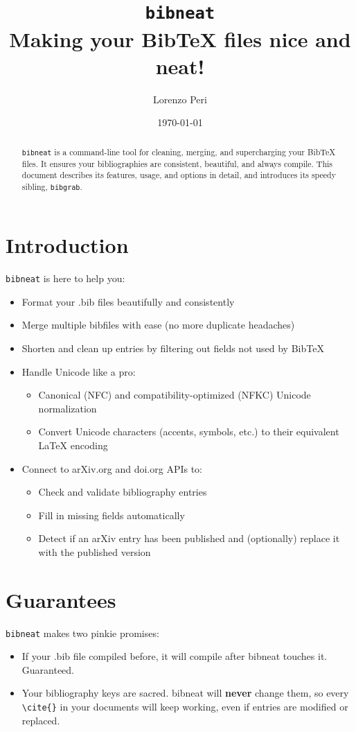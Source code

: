 \documentclass[11pt]{article}
\title{\texttt{bibneat} \\ \large Making your BibTeX files nice and neat!}
\author{Lorenzo Peri}
\date{\today}
\begin{document}
\maketitle

\begin{abstract}
\texttt{bibneat} is a command-line tool for cleaning, merging, and supercharging your BibTeX files. It ensures your bibliographies are consistent, beautiful, and always compile. This document describes its features, usage, and options in detail, and introduces its speedy sibling, \texttt{bibgrab}.
\end{abstract}

\section{Introduction}
\texttt{bibneat} is here to help you:
\begin{itemize}
    \item Format your .bib files beautifully and consistently
    \item Merge multiple bibfiles with ease (no more duplicate headaches)
    \item Shorten and clean up entries by filtering out fields not used by BibTeX
    \item Handle Unicode like a pro:
    \begin{itemize}
        \item Canonical (NFC) and compatibility-optimized (NFKC) Unicode normalization
        \item Convert Unicode characters (accents, symbols, etc.) to their equivalent LaTeX encoding
    \end{itemize}
    \item Connect to arXiv.org and doi.org APIs to:
    \begin{itemize}
        \item Check and validate bibliography entries
        \item Fill in missing fields automatically
        \item Detect if an arXiv entry has been published and (optionally) replace it with the published version
    \end{itemize}
\end{itemize}

\section{Guarantees}
\texttt{bibneat} makes two pinkie promises:
\begin{itemize}
    \item If your .bib file compiled before, it will compile after bibneat touches it. Guaranteed.
    \item Your bibliography keys are sacred. bibneat will \textbf{never} change them, so every \verb|\cite{}| in your documents will keep working, even if entries are modified or replaced.
\end{itemize}
\end{document}
